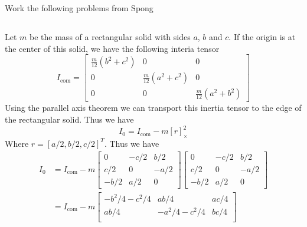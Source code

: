 \documentclass{../homework}
\begin{document}
    \begin{parts}[n]
        \part{} Work the following problems from Spong
       \begin{parts}
           \part{} Let $m$ be the mass of a rectangular solid with sides $a$, $b$ and $c$.
           If the origin is at the center of this solid, we have the following interia tensor
           \[
               I_{\text{com}} = 
               \begin{bmatrix}
                   \frac{m}{12} \left(b^2 +  c^2\right) & 0 & 0 \\
                   0 & \frac{m}{12} \left( a^2 + c^2 \right) & 0 \\
                   0 & 0 & \frac{m}{12} \left( a^2 + b^2 \right)
               \end{bmatrix}
           \]
           Using the parallel axis theorem we can transport this inertia tensor to the edge of the rectangular solid. Thus we have
           \[
               I_{0} = I_{\text{com}} - m[r]_{\times}^2
           \]
           Where $r = [a/2, b/2, c/2]^T$. Thus we have
           \[
               \begin{aligned}
                   I_0 &= 
                   I_{\text{com}} -
                   m \begin{bmatrix}
                   0 & -c/2 & b/2 \\
                   c/2 & 0 & -a/2 \\
                   -b/2 & a/2 & 0
                   \end{bmatrix}
                   \begin{bmatrix}
                   0 & -c/2 & b/2 \\
                   c/2 & 0 & -a/2 \\
                   -b/2 & a/2 & 0
                   \end{bmatrix}
                   \\
                       &=
                   I_{\text{com}}
                   - m
                   \begin{bmatrix}
                       -b^2/4 - c^2/4 & ab/4 & ac/4 \\
                       ab/4 & -a^2/4 - c^2/4 & bc/4 \\

\end{bmatrix}
\end{aligned}\]
\end{parts}
\end{parts}
\end{document}
